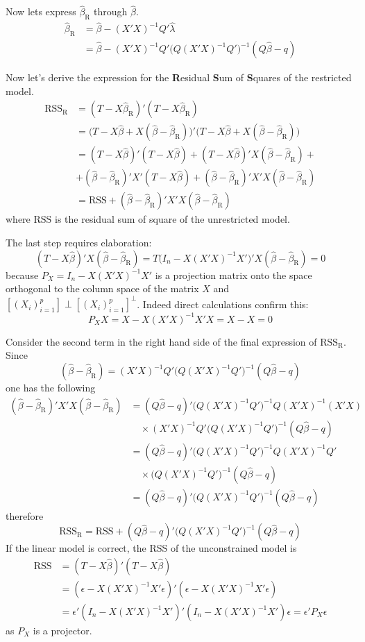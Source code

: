 \documentclass[a4paper]{article}
\newcommand{\clo}[1]{{\left [ #1 \right ]}}
\newcommand{\R}{\text{R}}
\newcommand{\RSS}{\text{RSS}}
\begin{document}
Now lets express $\hat{\beta}_\R$ through $\hat{\beta}$.
\begin{align*}
	\hat{\beta}_\R
	&= \hat{\beta} - (X'X)^{-1}Q'\hat{\lambda} \\
	&= \hat{\beta} - (X'X)^{-1}Q'\big(Q(X'X)^{-1}Q'\big)^{-1}(Q\hat{\beta}-q)
\end{align*}

Now let's derive the expression for the \textbf{R}esidual \textbf{S}um of \textbf{S}quares of the restricted model.
\begin{align*}
	\RSS_\R &= (T - X\hat{\beta}_\R)'(T - X\hat{\beta}_\R)\\
	&= \big(T - X\hat{\beta} + X (\hat{\beta} - \hat{\beta}_\R) \big)'\big(T - X\hat{\beta} + X (\hat{\beta} - \hat{\beta}_\R) \big)\\
	&= (T - X\hat{\beta})'(T - X\hat{\beta}) + (T - X\hat{\beta})'X (\hat{\beta} - \hat{\beta}_\R) + \\
	&+(\hat{\beta} - \hat{\beta}_\R)'X'(T - X\hat{\beta}) + (\hat{\beta} - \hat{\beta}_\R)'X'X(\hat{\beta} - \hat{\beta}_\R) \\
	&= \RSS + (\hat{\beta} - \hat{\beta}_\R)'X'X(\hat{\beta} - \hat{\beta}_\R)
\end{align*}
where $\RSS$ is the residual sum of square of the unrestricted model.

The last step requires elaboration:
\[(T - X\hat{\beta})'X (\hat{\beta} - \hat{\beta}_\R) = T\big(I_n - X(X'X)^{-1}X'\big)'X (\hat{\beta} - \hat{\beta}_\R) = 0\]
because $P_X = I_n - X(X'X)^{-1}X'$ is a projection matrix onto the space orthogonal to the column space of the matrix $X$ and $\clo{(X_i)_{i=1}^p} \perp \clo{(X_i)_{i=1}^p}^\perp$. Indeed direct calculations confirm this:
\[P_X X = X - X(X'X)^{-1}X'X = X - X = 0\]

Consider the second term in the right hand side of the final expression of $\RSS_\R$. Since 
\[(\hat{\beta} - \hat{\beta}_\R) = (X'X)^{-1}Q'\big(Q(X'X)^{-1}Q'\big)^{-1}(Q\hat{\beta}-q)\]
one has the following
\begin{align*}
	(\hat{\beta} - \hat{\beta}_\R)'X'X(\hat{\beta} - \hat{\beta}_\R)
	&= (Q\hat{\beta}-q)'\big(Q(X'X)^{-1}Q'\big)^{-1}Q(X'X)^{-1} (X'X) \\
	&\quad\times (X'X)^{-1}Q'\big(Q(X'X)^{-1}Q'\big)^{-1}(Q\hat{\beta}-q)\\
	&= (Q\hat{\beta}-q)'\big(Q(X'X)^{-1}Q'\big)^{-1}Q(X'X)^{-1}Q' \\
	&\quad\times \big(Q(X'X)^{-1}Q'\big)^{-1}(Q\hat{\beta}-q)\\
	&= (Q\hat{\beta}-q)'\big(Q(X'X)^{-1}Q'\big)^{-1}(Q\hat{\beta}-q)
\end{align*}
therefore
\[\RSS_\R = \RSS + (Q\hat{\beta}-q)'\big(Q(X'X)^{-1}Q'\big)^{-1}(Q\hat{\beta}-q)\]
If the linear model is correct, the RSS of the unconstrained model is
\begin{align*}
	\RSS &= (T - X\hat{\beta})'(T - X\hat{\beta}) \\
	&= (\epsilon - X(X'X)^{-1}X'\epsilon)'(\epsilon - X(X'X)^{-1}X'\epsilon) \\
	&= \epsilon'(I_n - X(X'X)^{-1}X')'(I_n - X(X'X)^{-1}X')\epsilon = \epsilon'P_X \epsilon
\end{align*}
as $P_X$ is a projector.
\end{document}
